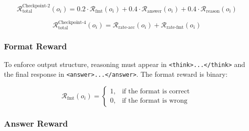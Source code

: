\begin{equation}\label{eq:ch2:analysis_total_reward}
    \mathcal{R}^{\text{Checkpoint-2}}_{\text{total}}(o_i)
    = 0.2 \cdot \mathcal{R}_{\text{fmt}}(o_i)
    + 0.4 \cdot \mathcal{R}_{\text{answer}}(o_i)
    + 0.4 \cdot \mathcal{R}_{\text{reason}}(o_i)
\end{equation}

\begin{equation}\label{eq:ch2:decision_total_reward}
    \mathcal{R}^{\text{Checkpoint-4}}_{\text{total}}(o_i)
    = \mathcal{R}_{\text{rate-acc}}(o_i)
    + \mathcal{R}_{\text{rate-fmt}}(o_i)
\end{equation}


\subsubsection*{Format Reward}
To enforce output structure, reasoning must appear in \texttt{<think>...</think>} and the final response in \texttt{<answer>...</answer>}. The format reward is binary:


\begin{equation}\label{eq:ch2:format_reward}
    \mathcal{R}_{\text{fmt}}(o_i) = 
    \begin{cases}
        1, & \text{if the format is correct} \\
        0, & \text{if the format is wrong}
    \end{cases}
\end{equation}




\subsubsection*{Answer Reward}

